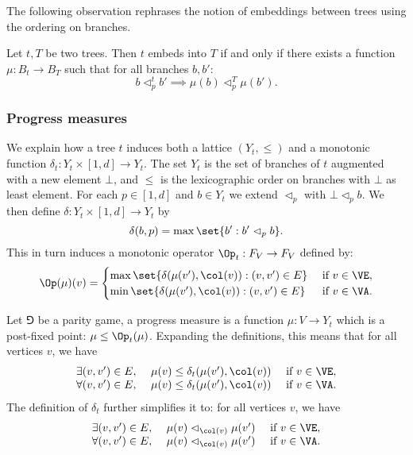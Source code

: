 The following observation rephrases the notion of embeddings between trees using the ordering on branches.

\begin{fact}
\label{3-fact:embedding}
Let $t,T$ be two trees.
Then $t$ embeds into $T$ if and only if there exists a function $\mu : B_t \to B_T$
such that for all branches $b,b'$:
\[
b \vartriangleleft_p^t b' \implies \mu(b) \vartriangleleft_p^T \mu(b').
\]
\end{fact}

\subsubsection*{Progress measures}
We explain how a tree $t$ induces both a lattice $(Y_t,\le)$ and a monotonic function $\delta_t : Y_t \times [1,d] \to Y_t$.
The set $Y_t$ is the set of branches of $t$ augmented with a new element $\bot$, 
and $\le$ is the lexicographic order on branches with $\bot$ as least element.
For each $p \in [1,d]$ and $b \in Y_t$ we extend $\vartriangleleft_p$ with $\bot \vartriangleleft_p b$.
We then define $\delta : Y_t \times [1,d] \to Y_t$ by
\[
\delta(b,p) = \max \set{b' : b' \vartriangleleft_p b}.
\]
This in turn induces a monotonic operator $\Op_t : F_V \to F_V$ defined by:
\[
\Op(\mu)(v) = 
\begin{cases}
\max \set{\delta( \mu(v'), \col(v)) : (v,v') \in E} & \text{ if } v \in \VE, \\
\min \set{\delta( \mu(v'), \col(v)) : (v,v') \in E} & \text{ if } v \in \VA.
\end{cases}
\]

Let $\Game$ be a parity game, a progress measure is a function $\mu : V \to Y_t$ which is a post-fixed point: $\mu \le \Op_t(\mu)$. 
Expanding the definitions, this means that for all vertices $v$, we have
\[
\begin{array}{llll}
\exists (v,v') \in E,\ & \mu(v) \le \delta_t( \mu(v'), \col(v)) & \text{ if } v \in \VE, \\
\forall (v,v') \in E,\ & \mu(v) \le \delta_t( \mu(v'), \col(v)) & \text{ if } v \in \VA.
\end{array}
\]
The definition of $\delta_t$ further simplifies it to: for all vertices $v$, we have
\[
\begin{array}{llll}
\exists (v,v') \in E,\ & \mu(v) \vartriangleleft_{\col(v)} \mu(v') & \text{ if } v \in \VE, \\
\forall (v,v') \in E,\ & \mu(v) \vartriangleleft_{\col(v)} \mu(v') & \text{ if } v \in \VA.
\end{array}
\]

